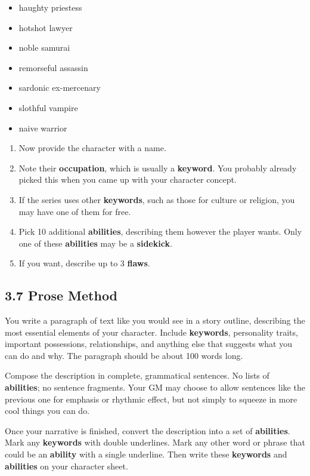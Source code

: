 \documentclass[
]{article}
\providecommand{\tightlist}{%
  \setlength{\itemsep}{0pt}\setlength{\parskip}{0pt}}
\begin{document}
\begin{itemize}
\tightlist
\item
  haughty priestess
\item
  hotshot lawyer
\item
  noble samurai
\item
  remorseful assassin
\item
  sardonic ex-mercenary
\item
  slothful vampire
\item
  naive warrior
\end{itemize}

\begin{enumerate}
\def\labelenumi{\arabic{enumi}.}
\setcounter{enumi}{1}
\tightlist
\item
  Now provide the character with a name.
\item
  Note their \textbf{occupation}, which is usually a \textbf{keyword}.
  You probably already picked this when you came up with your character
  concept.
\item
  If the series uses other \textbf{keywords}, such as those for culture
  or religion, you may have one of them for free.
\item
  Pick 10 additional \textbf{abilities}, describing them however the
  player wants. Only one of these \textbf{abilities} may be a
  \textbf{sidekick}.
\item
  If you want, describe up to 3 \textbf{flaws}.
\end{enumerate}

\hypertarget{prose-method}{%
\subsection{3.7 Prose Method}\label{prose-method}}

You write a paragraph of text like you would see in a story outline,
describing the most essential elements of your character. Include
\textbf{keywords}, personality traits, important possessions,
relationships, and anything else that suggests what you can do and why.
The paragraph should be about 100 words long.

Compose the description in complete, grammatical sentences. No lists of
\textbf{abilities}; no sentence fragments. Your GM may choose to allow
sentences like the previous one for emphasis or rhythmic effect, but not
simply to squeeze in more cool things you can do.

Once your narrative is finished, convert the description into a set of
\textbf{abilities}. Mark any \textbf{keywords} with double underlines.
Mark any other word or phrase that could be an \textbf{ability} with a
single underline. Then write these \textbf{keywords} and
\textbf{abilities} on your character sheet.
\end{document}
